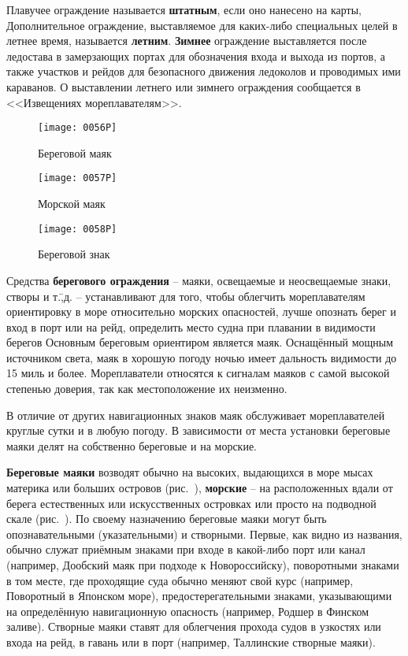 Плавучее ограждение называется
\textbf{штатным}, если оно нанесено на
карты, Дополнительное ограждение, выставляемое для каких-либо
специальных целей в летнее время, называется
\textbf{летним}. \textbf{Зимнее}
ограждение выставляется после ледостава в замерзающих портах для
обозначения входа и выхода из портов, а также участков и рейдов для
безопасного движения ледоколов и проводимых ими караванов. О
выставлении летнего или зимнего ограждения сообщается в <<Извещениях
мореплавателям>>.


\begin{figure}[htb]
  \centering{}
  \texttt{[image: 0056P]}
  \caption{Береговой маяк}
  \label{fig:56}
  \endminipage
  \hfill
  \centering{}
  \texttt{[image: 0057P]}
  \caption{Морской маяк}
  \label{fig:57}
  \endminipage
  \hfill
  \centering{}
  \texttt{[image: 0058P]}
  \caption{Береговой знак}
  \label{fig:58}
  \endminipage
\end{figure}

Средства \textbf{берегового ограждения}
\--- маяки, освещаемые и неосвещаемые знаки, створы и т.\=,д. \---
устанавливают для того, чтобы облегчить мореплавателям ориентировку в
море относительно морских опасностей, лучше опознать берег и вход в
порт или на рейд, определить место судна при плавании в видимости
берегов Основным береговым ориентиром является маяк. Оснащённый мощным
источником света, маяк в хорошую погоду ночью имеет дальность
видимости до 15 миль и более. Мореплаватели относятся к
сигналам маяков с самой высокой степенью доверия, так как
местоположение их неизменно.

В отличие от других навигационных знаков маяк обслуживает
мореплавателей круглые сутки и в любую погоду. В зависимости от места
установки береговые маяки делят на собственно береговые и на морские.

\textbf{Береговые маяки} возводят обычно на высоких, выдающихся в море
мысах материка или больших островов (рис.~), \textbf{морские}
\--- на расположенных вдали от берега естественных или искусственных
островках или просто на подводной скале (рис.~). По своему
назначению береговые маяки могут быть опознавательными (указательными)
и створными. Первые, как видно из названия, обычно служат приёмным
знаками при входе в какой-либо порт или канал (например, Дообский маяк
при подходе к Новороссийску), поворотными знаками в том месте, где
проходящие суда обычно меняют свой курс (например, Поворотный в
Японском море), предостерегательными знаками, указывающими на
определённую навигационную опасность (например, Родшер в Финском
заливе). Створные маяки ставят для облегчения прохода судов в узкостях
или входа на рейд, в гавань или в порт (например, Таллинские створные
маяки).

